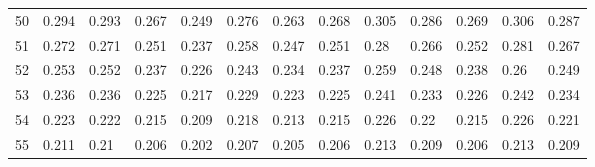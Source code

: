 \documentclass[]{article}
\begin{document}
\begin{appendix}
\begin{table}
\begin{tabular}[c]{|l|p{0.9cm}|p{0.9cm}|p{0.9cm}|p{0.9cm}|p{0.9cm}|p{0.9cm}|p{0.9cm}|p{0.9cm}|p{0.9cm}|p{0.9cm}|p{0.9cm}|p{0.9cm}|}
50&0.294&0.293&0.267&0.249&0.276&0.263&0.268&0.305&0.286&0.269&0.306&0.287\\
51&0.272&0.271&0.251&0.237&0.258&0.247&0.251&0.28&0.266&0.252&0.281&0.267\\
52&0.253&0.252&0.237&0.226&0.243&0.234&0.237&0.259&0.248&0.238&0.26&0.249\\
53&0.236&0.236&0.225&0.217&0.229&0.223&0.225&0.241&0.233&0.226&0.242&0.234\\
54&0.223&0.222&0.215&0.209&0.218&0.213&0.215&0.226&0.22&0.215&0.226&0.221\\
55&0.211&0.21&0.206&0.202&0.207&0.205&0.206&0.213&0.209&0.206&0.213&0.209\\
		\hline
	\end{tabular}
\end{table}
\resetgeometry


\end{appendix}
\end{document}
